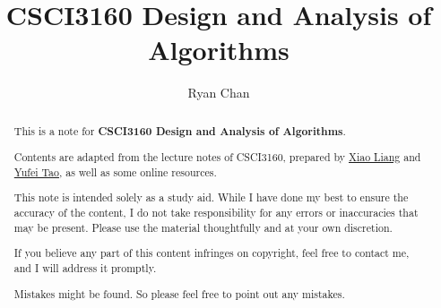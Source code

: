 \documentclass[a4paper]{report}
\author{Ryan Chan}
\title{CSCI3160 Design and Analysis of Algorithms}
\begin{document}
\setlength\parindent{0pt}

\maketitle

\newpage

\begin{abstract}
	This is a note for \textbf{CSCI3160 Design and Analysis of Algorithms}. 
	
	Contents are adapted from the lecture notes of CSCI3160, prepared by \href{https://xiao-liang.github.io}{Xiao Liang} and \href{https://www.cse.cuhk.edu.hk/~taoyf/}{Yufei Tao}, as well as some online resources.
	
	This note is intended solely as a study aid. While I have done my best to ensure the accuracy of the content, I do not take responsibility for any errors or inaccuracies that may be present. Please use the material thoughtfully and at your own discretion.
	
	If you believe any part of this content infringes on copyright, feel free to contact me, and I will address it promptly.
	
	Mistakes might be found. So please feel free to point out any mistakes.
\end{abstract}

\newpage

\tableofcontents

\setlength{\parskip}{5pt}
\end{document}

